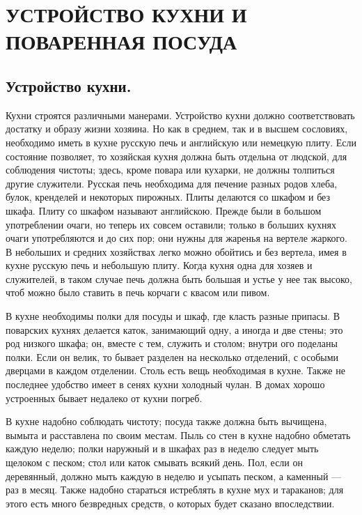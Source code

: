 \section{УСТРОЙСТВО КУХНИ И ПОВАРЕННАЯ ПОСУДА} %

\subsection{Устройство кухни.}
Кухни строятся различными манерами. Устройство кухни должно соответствовать достатку и образу жизни хозяина. Но как в среднем, так и в высшем сословиях, необходимо иметь в кухне русскую печь и английскую или немецкую плиту. Если состояние позволяет, то хозяйская кухня должна быть отдельна от людской, для соблюдения чистоты; здесь, кроме повара или кухарки, не должны толпиться другие служители. Русская печь необходима для печение разных родов хлеба, булок, кренделей и некоторых пирожных. Плиты делаются со шкафом и без шкафа. Плиту со шкафом называют английскою. Прежде были в большом употреблении очаги, но теперь их совсем оставили; только в больших кухнях очаги употребляются и до сих пор; они нужны для жаренья на вертеле жаркого. В небольших и средних хозяйствах легко можно обойтись и без вертела, имея в кухне русскую печь и небольшую плиту. Когда кухня одна для хозяев и служителей, в таком случае печь должна быть большая и устье у нее так высоко, чтоб можно было ставить в печь корчаги с квасом или пивом.

В кухне необходимы полки для посуды и шкаф, где класть разные припасы. В поварских кухнях делается каток, занимающий одну, а иногда и две стены; это род низкого шкафа; он, вместе с тем, служить и столом; внутри ого поделаны полки. Если он велик, то бывает разделен на несколько отделений, с особыми дверцами в каждом отделении. Столь есть вещь необходимая в кухне. Также не последнее удобство имеет в сенях кухни холодный чулан. В домах хорошо устроенных бывает недалеко от кухни погреб.

В кухне надобно соблюдать чистоту; посуда также должна быть вычищена, вымыта и расставлена по своим местам. Пыль со стен в кухне надобно обметать каждую неделю; полки наружный и в шкафах раз в неделю следует мыть щелоком с песком; стол или каток смывать всякий день. Пол, если он деревянный, должно мыть каждую в неделю и усыпать песком, а каменный — раз в месяц. Также надобно стараться истреблять в кухне мух и тараканов; для этого есть много безвредных средств, о которых будет сказано впоследствии.

